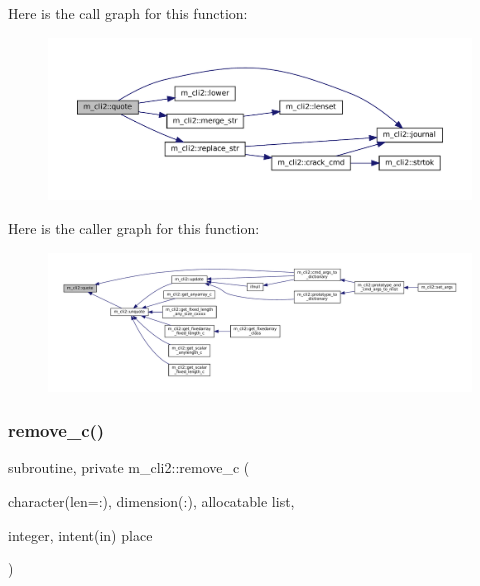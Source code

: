 Here is the call graph for this function\+:
\nopagebreak
\begin{figure}[H]
\begin{center}
\leavevmode
\includegraphics[width=350pt]{namespacem__cli2_a63f81a2c027eb5f3e0a77167ac29fc73_cgraph}
\end{center}
\end{figure}
Here is the caller graph for this function\+:
\nopagebreak
\begin{figure}[H]
\begin{center}
\leavevmode
\includegraphics[width=350pt]{namespacem__cli2_a63f81a2c027eb5f3e0a77167ac29fc73_icgraph}
\end{center}
\end{figure}
\mbox{\label{namespacem__cli2_a155af513c048d68552ec2e8fb54e1294}} 
\subsubsection{\texorpdfstring{remove\+\_\+c()}{remove\_c()}}
{\footnotesize\ttfamily subroutine, private m\+\_\+cli2\+::remove\+\_\+c (\begin{DoxyParamCaption}\item[{character(len=\+:), dimension(\+:), allocatable}]{list,  }\item[{integer, intent(in)}]{place }\end{DoxyParamCaption})\hspace{0.3cm}{\ttfamily [private]}}



